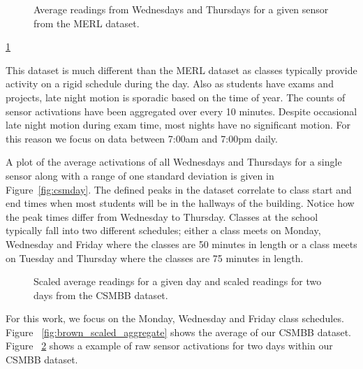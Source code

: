 \begin{figure}[h]
	\begin{center}
	\end{center}
	\caption{Average readings from Wednesdays and Thursdays for a given sensor from the MERL dataset.}
	\label{fig:brown_day_raw}
\end{figure}

\ref{fig:brown_day_raw}

This dataset is much different than the MERL dataset as classes typically provide activity on a rigid schedule during the day.  Also as students have exams and projects, late night motion is sporadic based on the time of year.  The counts of sensor activations have been aggregated over every 10 minutes.  Despite occasional late night motion during exam time, most nights have no significant motion.  For this reason we focus on data between 7:00am and 7:00pm daily.  

A plot of the average activations of all Wednesdays and Thursdays for a single sensor along with a range of one standard deviation is given in Figure~\ref{fig:csmday}.  The defined peaks in the dataset correlate to class start and end times when most students will be in the hallways of the building.  Notice how the peak times differ from Wednesday to Thursday.  Classes at the school typically fall into two different schedules; either a class meets on Monday, Wednesday and Friday where the classes are 50 minutes in length or a class meets on Tuesday and Thursday where the classes are 75 minutes in length. 

\begin{figure}[!ht]
	\begin{center}
		\label{fig:brown_scaled_aggregate}
		\label{fig:brown_scaled_raw}
	\end{center}
	\caption{Scaled average readings for a given day and scaled readings for two days from the CSMBB dataset.}
\end{figure}

For this work, we focus on the Monday, Wednesday and Friday class schedules.  Figure ~\ref{fig:brown_scaled_aggregate} shows the average of our CSMBB dataset.  Figure ~\ref{fig:brown_scaled_raw} shows a example of raw sensor activations for two days within our CSMBB dataset.


